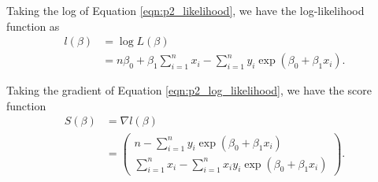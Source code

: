 \documentclass[letterpaper,11pt]{article}
\begin{document}
\begin{enumerate}
\begin{enumerate}
\begin{description}
      Taking the log of Equation \ref{eqn:p2_likelihood}, we have the
      log-likelihood function as
      \begin{align}
        l\left(\beta\right)
        &= \log L\left(\beta\right) \nonumber\\
        &= n\beta_0 + \beta_1\sum_{i=1}^nx_i -
          \sum_{i=1}^ny_i\exp\left(\beta_0 + \beta_1x_i\right).
          \label{eqn:p2_log_likelihood}
      \end{align}

      Taking the gradient of Equation \ref{eqn:p2_log_likelihood}, we have the
      score function
      \begin{align}
        S\left(\beta\right)
        &= \nabla l\left(\beta\right) \nonumber\\
        &= \begin{pmatrix}
          n - \sum_{i=1}^ny_i\exp\left(\beta_0 + \beta_1x_i\right) \\
          \sum_{i=1}^nx_i - \sum_{i=1}^n x_iy_i\exp\left(\beta_0 + \beta_1x_i\right)
        \end{pmatrix}.
        \label{eqn:p2_score}
      \end{align}


\end{description}
\end{enumerate}
\end{enumerate}
\end{document}
